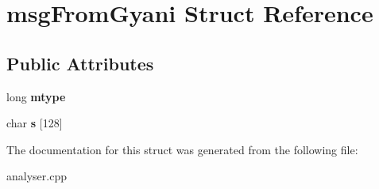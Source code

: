 \hypertarget{structmsgFromGyani}{\section{msg\-From\-Gyani \-Struct \-Reference}
\label{structmsgFromGyani}
}
\subsection*{\-Public \-Attributes}
\begin{DoxyCompactItemize}
\item 
\hypertarget{structmsgFromGyani_a1ccbc2db890dfb06ae0d89f0648144b5}{long {\bfseries mtype}}\label{structmsgFromGyani_a1ccbc2db890dfb06ae0d89f0648144b5}

\item 
\hypertarget{structmsgFromGyani_a1aadc93a828d5002fac40accb16f773a}{char {\bfseries s} \mbox{[}128\mbox{]}}\label{structmsgFromGyani_a1aadc93a828d5002fac40accb16f773a}

\end{DoxyCompactItemize}


\-The documentation for this struct was generated from the following file\-:\begin{DoxyCompactItemize}
\item 
analyser.\-cpp\end{DoxyCompactItemize}
